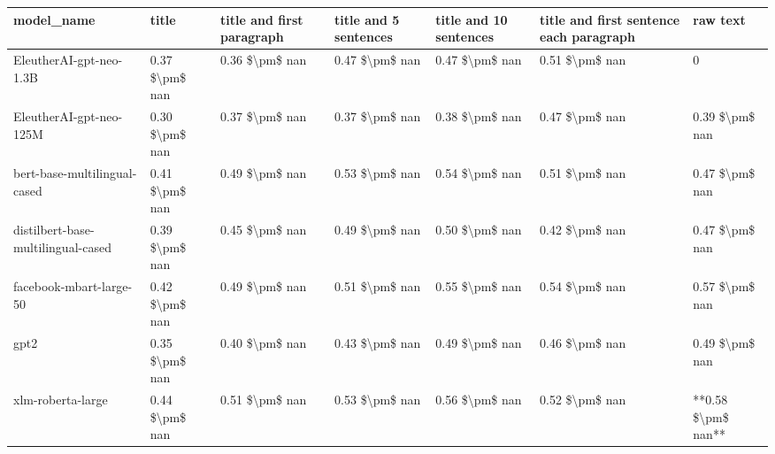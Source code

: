 \begin{tabular}{lllllll}
\toprule
                        model\_name &          title & title and first paragraph & title and 5 sentences & title and 10 sentences & title and first sentence each paragraph &           raw text \\
\midrule
           EleutherAI-gpt-neo-1.3B & 0.37 \$\textbackslash pm\$ nan &            0.36 \$\textbackslash pm\$ nan &        0.47 \$\textbackslash pm\$ nan &         0.47 \$\textbackslash pm\$ nan &                          0.51 \$\textbackslash pm\$ nan &                  0 \\
           EleutherAI-gpt-neo-125M & 0.30 \$\textbackslash pm\$ nan &            0.37 \$\textbackslash pm\$ nan &        0.37 \$\textbackslash pm\$ nan &         0.38 \$\textbackslash pm\$ nan &                          0.47 \$\textbackslash pm\$ nan &     0.39 \$\textbackslash pm\$ nan \\
      bert-base-multilingual-cased & 0.41 \$\textbackslash pm\$ nan &            0.49 \$\textbackslash pm\$ nan &        0.53 \$\textbackslash pm\$ nan &         0.54 \$\textbackslash pm\$ nan &                          0.51 \$\textbackslash pm\$ nan &     0.47 \$\textbackslash pm\$ nan \\
distilbert-base-multilingual-cased & 0.39 \$\textbackslash pm\$ nan &            0.45 \$\textbackslash pm\$ nan &        0.49 \$\textbackslash pm\$ nan &         0.50 \$\textbackslash pm\$ nan &                          0.42 \$\textbackslash pm\$ nan &     0.47 \$\textbackslash pm\$ nan \\
           facebook-mbart-large-50 & 0.42 \$\textbackslash pm\$ nan &            0.49 \$\textbackslash pm\$ nan &        0.51 \$\textbackslash pm\$ nan &         0.55 \$\textbackslash pm\$ nan &                          0.54 \$\textbackslash pm\$ nan &     0.57 \$\textbackslash pm\$ nan \\
                              gpt2 & 0.35 \$\textbackslash pm\$ nan &            0.40 \$\textbackslash pm\$ nan &        0.43 \$\textbackslash pm\$ nan &         0.49 \$\textbackslash pm\$ nan &                          0.46 \$\textbackslash pm\$ nan &     0.49 \$\textbackslash pm\$ nan \\
                 xlm-roberta-large & 0.44 \$\textbackslash pm\$ nan &            0.51 \$\textbackslash pm\$ nan &        0.53 \$\textbackslash pm\$ nan &         0.56 \$\textbackslash pm\$ nan &                          0.52 \$\textbackslash pm\$ nan & **0.58 \$\textbackslash pm\$ nan** \\
\bottomrule
\end{tabular}

